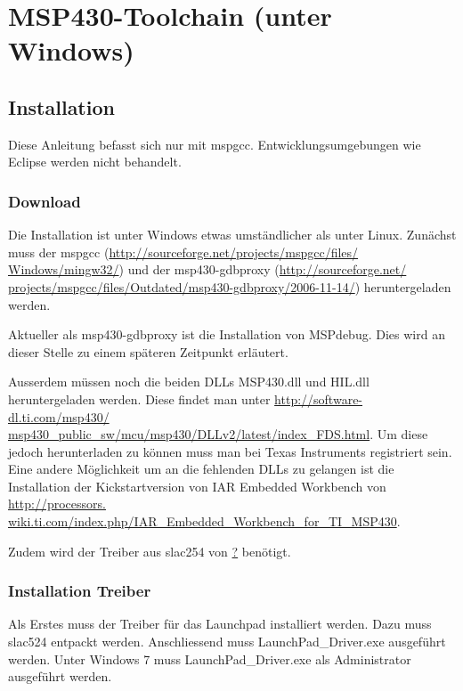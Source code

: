 \section{MSP430-Toolchain (unter Windows)}
\subsection{Installation}
Diese Anleitung befasst sich nur mit mspgcc. Entwicklungsumgebungen wie Eclipse 
werden nicht behandelt. 
\subsubsection{Download}
Die Installation ist unter Windows etwas umständlicher als unter Linux. 
Zunächst muss der mspgcc (\url{http://sourceforge.net/projects/mspgcc/files/
Windows/mingw32/}) und der msp430-gdbproxy (\url{http://sourceforge.net/
projects/mspgcc/files/Outdated/msp430-gdbproxy/2006-11-14/}) heruntergeladen 
werden. 

Aktueller als msp430-gdbproxy ist die Installation von MSPdebug. Dies wird an 
dieser Stelle zu einem späteren Zeitpunkt erläutert. 

Ausserdem müssen noch die beiden DLLs MSP430.dll und HIL.dll heruntergeladen 
werden. Diese findet man unter \url{http://software-dl.ti.com/msp430/
msp430_public_sw/mcu/msp430/DLLv2/latest/index_FDS.html}. Um diese jedoch 
herunterladen zu können muss man bei Texas Instruments registriert sein. Eine 
andere Möglichkeit um an die fehlenden DLLs zu gelangen ist die Installation 
der Kickstartversion von IAR Embedded Workbench von \url{http://processors.
wiki.ti.com/index.php/IAR_Embedded_Workbench_for_TI_MSP430}. 

Zudem wird der Treiber aus slac254 von \url{?} benötigt. 

\subsubsection{Installation Treiber}
Als Erstes muss der Treiber für das Launchpad installiert werden. Dazu muss 
slac524 entpackt werden. Anschliessend muss LaunchPad\_Driver.exe ausgeführt 
werden. Unter Windows 7 muss LaunchPad\_Driver.exe als Administrator ausgeführt 
werden. 




